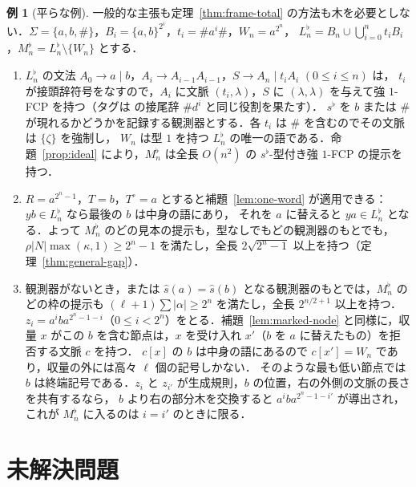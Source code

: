 \documentclass[11pt,a4paper]{ltjsarticle}
\numberwithin{equation}{section}
\theoremstyle{plain}
\theoremstyle{definition}
\newtheorem{example}[theorem]{例}
\theoremstyle{remark}
\theoremstyle{plain}
\newcommand{\eps}{\lambda}
\begin{document}
\begin{example}[平らな例]\label{ex:flat}
一般的な主張も定理~\ref{thm:frame-total} の方法も木を必要としない．$\Sigma=\{a,b,\#\}$，$B_i=\{a,b\}^{2^i}$，$t_i=\#a^i\#$，$W_n=a^{2^n}$，
$L^\flat_n=B_n\cup\bigcup_{i=0}^nt_iB_i$，$M^\flat_n=L^\flat_n\setminus\{W_n\}$ とする．
\begin{enumerate}[label=\textup{(\roman*)},nosep]
\item $L^\flat_n$ の文法 $A_0\to a\mid b$，$A_i\to A_{i-1}A_{i-1}$，$S\to A_n\mid t_iA_i$ $(0\le i\le n)$ は，
$t_i$ が接頭辞符号をなすので，$A_i$ に文脈 $(t_i,\eps)$，$S$ に $(\eps,\eps)$ を与えて強 $1$-FCP を持つ（タグは \citealp[Thm.~5]{ky2021} の接尾辞 $\#d^i$ と同じ役割を果たす）．
$s^\flat$ を $b$ または $\#$ が現れるかどうかを記録する観測器とする．各 $t_i$ は $\#$ を含むのでその文脈は $\{\zeta\}$ を強制し，
$W_n$ は型 $1$ を持つ $L^\flat_n$ の唯一の語である．命題~\ref{prop:ideal} により，$M^\flat_n$ は全長 $O(n^2)$ の $s^\flat$-型付き強 $1$-FCP の提示を持つ．
\item $R=a^{2^n-1}$，$T=b$，$T^\circ=a$ とすると補題~\ref{lem:one-word} が適用できる：$yb\in L^\flat_n$ なら最後の $b$ は中身の語にあり，
それを $a$ に替えると $ya\in L^\flat_n$ となる．よって $M^\flat_n$ のどの見本の提示も，型なしでもどの観測器のもとでも，
$\rho|N|\max(\kappa,1)\ge2^n-1$ を満たし，全長 $2\sqrt{2^n-1}$ 以上を持つ（定理~\ref{thm:general-gap}）．
\item 観測器がないとき，または $\widehat s(a)=\widehat s(b)$ となる観測器のもとでは，$M^\flat_n$ のどの枠の提示も
$(\ell+1)\sum|\alpha|\ge2^n$ を満たし，全長 $2^{n/2+1}$ 以上を持つ．$z_i=a^iba^{2^n-1-i}$（$0\le i<2^n$）をとる．補題~\ref{lem:marked-node} と同様に，収量 $x$ がこの $b$ を含む節点は，$x$ を受け入れ $x'$（$b$ を $a$ に替えたもの）を拒否する文脈 $c$ を持つ．
$c[x]$ の $b$ は中身の語にあるので $c[x']=W_n$ であり，収量の外には高々 $\ell$ 個の記号しかない．
そのような最も低い節点では $b$ は終端記号である．$z_i$ と $z_{i'}$ が生成規則，$b$ の位置，右の外側の文脈の長さを共有するなら，
$b$ より右の部分木を交換すると $a^iba^{2^n-1-i'}$ が導出され，これが $M^\flat_n$ に入るのは $i=i'$ のときに限る．
\end{enumerate}
\end{example}

\section{未解決問題}\label{sec:open}
\end{document}
